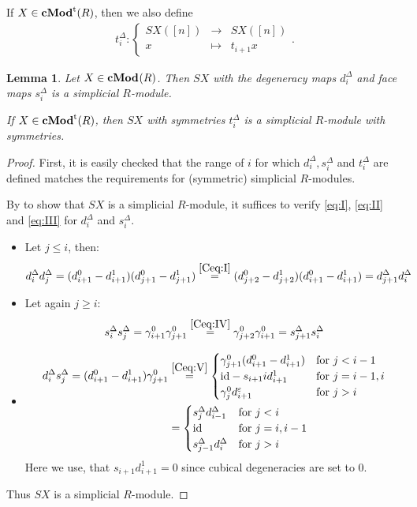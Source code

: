 \documentclass[12pt]{amsart}
\theoremstyle{plain}
\newtheorem{lemma}{Lemma}
\numberwithin{lemma}{\DefaultNumberTheoremWithin}
\numberwithin{claim}{\DefaultNumberTheoremWithin}
\numberwithin{theorem}{\DefaultNumberTheoremWithin}
\numberwithin{corollary}{\DefaultNumberTheoremWithin}
\numberwithin{proposition}{\DefaultNumberTheoremWithin}
\numberwithin{conjecture}{\DefaultNumberTheoremWithin}
\theoremstyle{definition}
\theoremstyle{definition}
\numberwithin{question}{\DefaultNumberTheoremWithin}
\theoremstyle{definition}
\numberwithin{problem}{\DefaultNumberTheoremWithin}
\theoremstyle{remark}
\numberwithin{remark}{\DefaultNumberTheoremWithin}
\theoremstyle{remark}
\numberwithin{example}{\DefaultNumberTheoremWithin}
\def\ve{\varepsilon}
\def\id{\textnormal{id}}
\def \la{\longrightarrow}
\def \lm{\longmapsto}
\def\for{\textnormal{for }}
\def\trp{\textnormal{t}}
\def\Connection{\gamma}
\newcommand{\cMod}[2]{\mathbf{cMod}^{\textnormal{#1}}(#2)}  %
\begin{document}
    If $X \in \cMod{t}{R}$, then 
    we also define
    \begin{align*}
    t_i^\Delta\colon \left\{ \begin{array}{ccc} SX([n])&\la & SX([n])\\
    x&\lm& t_{i+1} x \end{array} . \right.
    \end{align*}
    
\begin{lemma} \label{lem:sx}
Let $X \in \cMod{}{R}$.
Then $SX$ with the degeneracy maps $d_i^\Delta$ and face maps $s_i^\Delta$ 
 is a simplicial $R$-module.
 
 If $X \in \cMod{\trp}{R}$, then
 $SX$ with symmetries $t_i^ \Delta$ is a simplicial $R$-module with symmetries. 
\end{lemma}
\begin{proof}
   First, it is easily checked that the range of $i$ for which $d_i^ \Delta,s_i^ \Delta$ and $t_i^ \Delta$ are defined matches the requirements for
   (symmetric) simplicial $R$-modules.

   By \cite[Proposition 8.1.3]{WeibelBook}
   to show that $SX$ is a simplicial $R$-module, it suffices to verify \eqref{eq:I}, \eqref{eq:II} and \eqref{eq:III} 
   for $d_i^ \Delta$ and $s_i^ {\Delta}$.
      \begin{itemize}
        \item[\eqref{eq:I}] Let $j\leq i$, then:
        \[
    d^\Delta_id^\Delta_j = (d_{i+1}^0-d_{i+1}^1)(d_{j+1}^0-d_{j+1}^1)\overset{\eqref{Ceq:I}}{=} (d_{j+2}^0-d_{j+2}^1)(d_{i+1}^0-d_{i+1}^1)=d^\Delta_{j+1}d^\Delta_i
    \]
        \item[\eqref{eq:II}]Let again $j\geq i$:
    \[
    s_i^\Delta s_j^\Delta =\Connection^0_{i+1}\Connection^0_{j+1}\overset{\eqref{Ceq:IV}}{=}\Connection^0_{j+2}\Connection^0_{i+1}= s_{j+1}^\Delta  s_i^\Delta
    \]
        \item[\eqref{eq:III}]
        \begin{align*}
        d_i^\Delta s_j^\Delta=(d_{i+1}^0-d_{i+1}^1)\Connection_{j+1}^0 &\overset{\eqref{Ceq:V}}{=}\begin{cases}
 \Connection_{j+1}^0(d_{i+1}^0-d_{i+1}^1) & \textnormal{for } j < i - 1 \\
\textnormal{id}-s_{i+1}id_{i+1}^1 & \textnormal{for } j = i - 1, i \\
\Connection_{j}^0d_{i+1}^\ve  & \textnormal{for } j > i
\end{cases}\\& = \begin{cases}
    s_{j}^\Delta d_{i-1}^\Delta &\for j<i\\
    \id &\for j=i,i-1\\
    s_{j-1}^\Delta d_i^\Delta &\for j>i
\end{cases}
        \end{align*}
        Here we use, that 
        $s_{i+1} d_{i+1}^1=0$ since cubical degeneracies are set to $0$.
        \end{itemize}
        Thus $SX$ is a simplicial $R$-module.


\end{proof}
\end{document}
